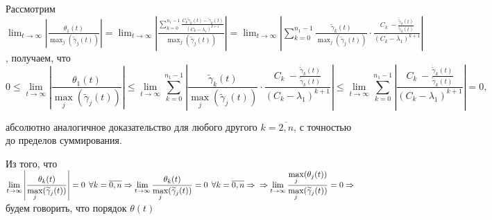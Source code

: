 \documentclass[12pt, a4paper]{article}
\begin{document}
\quad Рассмотрим $\displaystyle\lim_{t \rightarrow \infty}\left|\frac{\theta_1(t)}{\displaystyle\max_j(\widetilde{\gamma}_j(t))}\right| = \lim_{t \rightarrow \infty}\left|\frac{\displaystyle \sum_{k=0}^{n_1-1}\frac{C_k \widetilde{\gamma}_k(t) - \dot{\widetilde{\gamma}}_k(t)}{(C_k-\lambda_1)^{k+1}}}{\displaystyle\max_j(\widetilde{\gamma}_j(t))}\right| = \lim_{t \rightarrow \infty}\left| \displaystyle \sum_{k=0}^{n_1-1}\frac{\widetilde{\gamma}_k(t)}{\displaystyle\max_j(\widetilde{\gamma}_j(t))} \cdot \frac{C_k \ - \displaystyle \frac{\dot{\widetilde{\gamma}}_k(t)}{\widetilde{\gamma}_k(t)}}{(C_k-\lambda_1)^{k+1}}\right|$, получаем, что \[0 \leq \displaystyle\lim_{t \rightarrow \infty}\left|\frac{\theta_1(t)}{\displaystyle\max_j(\widetilde{\gamma}_j(t))}\right| \leq \lim_{t \rightarrow \infty} \displaystyle \sum_{k=0}^{n_1-1}\left|\frac{\widetilde{\gamma}_k(t)}{\displaystyle\max_j(\widetilde{\gamma}_j(t))} \cdot \frac{C_k \ - \displaystyle \frac{\dot{\widetilde{\gamma}}_k(t)}{\widetilde{\gamma}_k(t)}}{(C_k-\lambda_1)^{k+1}}\right| \leq \lim_{t \rightarrow \infty} \displaystyle \sum_{k=0}^{n_1-1}\left| \frac{C_k \ - \displaystyle \frac{\dot{\widetilde{\gamma}}_k(t)}{\widetilde{\gamma}_k(t)}}{(C_k-\lambda_1)^{k+1}}\right| = 0,\]

абсолютно аналогичное доказательство для любого другого $k = \overline{2, n}$, с точностью до пределов суммирования.

\quad Из того, что $\displaystyle\lim_{t \rightarrow \infty}\left|\frac{\theta_k(t)}{\displaystyle\max_j(\widetilde{\gamma}_j(t))}\right| = 0 \:\: \forall k=\overline{0, n} \Rightarrow \displaystyle\lim_{t \rightarrow \infty}\frac{\theta_k(t)}{\displaystyle\max_j(\widetilde{\gamma}_j(t))} = 0 \:\: \forall k=\overline{0, n} \Rightarrow \\ \Rightarrow \lim_{t \rightarrow \infty}\frac{\displaystyle\max_j(\theta_j(t))}{\displaystyle\max_j(\widetilde{\gamma}_j(t))} = 0 \Rightarrow$ будем говорить, что порядок $\theta(t)$
\end{document}
